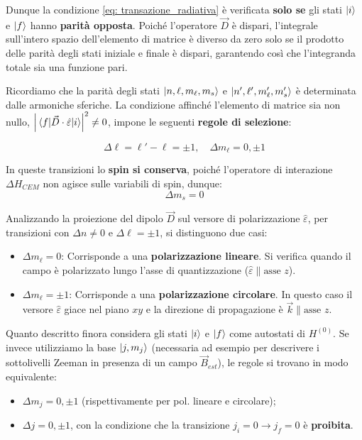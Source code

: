Dunque la condizione \ref{eq: transazione_radiativa} è verificata \textbf{solo se} gli stati \(\ket{i}\) e \(\ket{f}\) hanno \textbf{parità opposta}. Poiché l'operatore \(\vec{D}\) è dispari, l'integrale sull'intero spazio dell'elemento di matrice è diverso da zero solo se il prodotto delle parità degli stati iniziale e finale è dispari, garantendo così che l'integranda totale sia una funzione pari.

Ricordiamo che la parità degli stati \( \ket{n, \ell, m_{\ell}, m_s} \) e \( \ket{n', \ell', m_{\ell}', m_s'} \) è determinata dalle armoniche sferiche. La condizione affinché l'elemento di matrice sia non nullo, \( \abs{\mel{f}{\vec{D} \cdot \hat{\varepsilon}}{i}}^2 \neq 0 \), impone le seguenti \textbf{regole di selezione}:
\begin{importantbox}
    \begin{equation}
    \Delta \ell = \ell' - \ell = \pm 1, \quad \Delta m_{\ell} = 0, \pm 1
\end{equation}
\end{importantbox}

\begin{remark}
In queste transizioni lo \textbf{spin si conserva}, poiché l'operatore di interazione \( \Delta H_{CEM} \) non agisce sulle variabili di spin, dunque:
\begin{equation}
    \Delta m_s = 0
\end{equation}
\end{remark}

Analizzando la proiezione del dipolo \( \vec{D} \) sul versore di polarizzazione \( \hat{\varepsilon} \), per transizioni con \( \Delta n \neq 0 \) e \( \Delta \ell = \pm 1 \), si distinguono due casi:
\begin{itemize}
    \item \textbf{\(\Delta m_{\ell} = 0\)}: Corrisponde a una \textbf{polarizzazione lineare}. Si verifica quando il campo è polarizzato lungo l'asse di quantizzazione (\( \hat{\varepsilon} \parallel \text{asse } z \)).
    \item \textbf{\(\Delta m_{\ell} = \pm 1\)}: Corrisponde a una \textbf{polarizzazione circolare}. In questo caso il versore \( \hat{\varepsilon} \) giace nel piano \( xy \) e la direzione di propagazione è \( \vec{k} \parallel \text{asse } z \).
\end{itemize}

Quanto descritto finora considera gli stati \( \ket{i} \) e \( \ket{f} \) come autostati di \( H^{(0)} \). Se invece utilizziamo la base \( \ket{j, m_j} \) (necessaria ad esempio per descrivere i sottolivelli Zeeman in presenza di un campo \( \vec{B}_{est} \)), le regole si trovano in modo equivalente:
\begin{itemize}
    \item \(\Delta m_j = 0, \pm 1\) (rispettivamente per pol. lineare e circolare);
    \item \(\Delta j = 0, \pm 1\), con la condizione che la transizione \( j_i = 0 \longrightarrow j_f = 0 \) è \textbf{proibita}.
\end{itemize}

